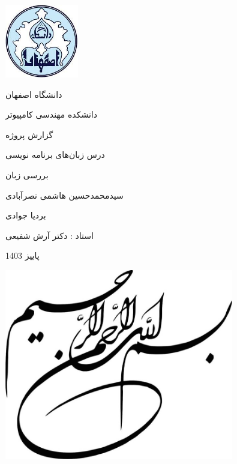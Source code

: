 \documentclass[11pt, a4paper, oneside]{book}
\begin{document}
	\begin{titlepage}
		\centering
		\includegraphics[width=3.2cm, height=3.2cm]{images/logo}\par
		\vspace{5mm}
		{\LARGE دانشگاه اصفهان}\par
		\vspace{5mm}
		{\Large دانشکده مهندسی کامپیوتر}\par
		
		\vspace{2cm}
		
		{\Large گزارش پروژه}\par
		
		\vspace{1cm}
		
		{\Large درس زبان‌های برنامه نویسی}\par
		
		\vspace{1cm}
		{\Huge بررسی زبان }\par
		
		
		\vspace{2cm}
		{\Large سیدمحمدحسین هاشمی نصرآبادی}\par
		{\Large بردیا جوادی}\par
		\vspace{1cm}
		{\large استاد : دکتر آرش شفیعی}\par

		\vspace{2cm}
		
		{\large پاییز 1403\par}
	\end{titlepage}
	
	\clearpage
	\begin{center}
		\includegraphics[width=10cm]{images/image002}
	\end{center}  
	\thispagestyle{plain}\mbox{} 
	\clearpage
	
\end{document}
